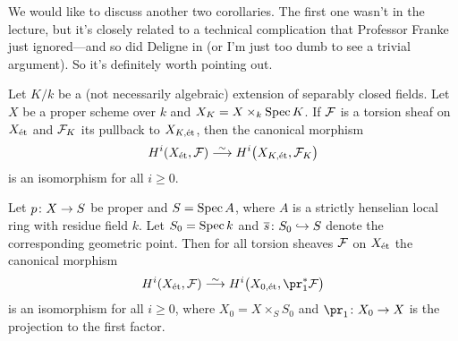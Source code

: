 \documentclass[a4paper, 10pt, oneside, DIV=9, chapterprefix=true, numbers=enddot, bibliography=totoc]{scrbook}
\begin{document}
We would like to discuss another two corollaries. The first one wasn't in the lecture, but it's closely related to a technical complication that Professor Franke just ignored---and so did Deligne in \cite[Arcata~IV]{sga4.5} (or I'm just too dumb to see a trivial argument). So it's definitely worth pointing out.
\begin{cor*}\label{cor*:fuckUp}
	Let $K/k$ be a (not necessarily algebraic) extension of separably closed fields. Let $X$ be a proper scheme over $k$ and $X_K=X\times_k\operatorname{Spec} K$. If $\mathcal{F}$ is a torsion sheaf on $X_{\mathrm{\acute{e}t}}$ and $\mathcal{F}_K$ its pullback to $X_{K,\mathrm{\acute{e}t}}$, then the canonical morphism
	\begin{equation*}
		H^i(X_\et,\Ff)\isomorphism H^i\big(X_{K,\et},\Ff_K\big)
	\end{equation*}
	is an isomorphism for all $i\geq 0$.
\end{cor*} 
\begin{cor}\label{cor:properBaseChange}
	Let $p\colon X\morphism S$ be proper and $S=\operatorname{Spec} A$, where $A$ is a strictly henselian local ring with residue field $k$. Let $S_0= \operatorname{Spec} k$ and $\ov{s}\colon S_0\monomorphism S$ denote the corresponding geometric point. Then for all torsion sheaves $\mathcal{F}$ on $X_{\mathrm{\acute{e}t}}$ the canonical morphism
	\begin{equation*}
		H^i(X_\et,\Ff)\isomorphism H^i\big(X_{0,\et},\pr_1^*\Ff\big)
	\end{equation*}
	is an isomorphism for all $i\geq 0$, where $X_0=X\times_SS_0$ and $\pr_1\colon X_0\morphism X$ is the projection to the first factor.
\end{cor}
\end{document}
